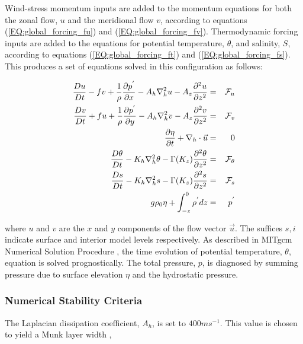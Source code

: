 Wind-stress momentum inputs are added to the momentum equations for both
the zonal flow, $u$ and the meridional flow $v$, according to equations 
(\ref{EQ:global_forcing_fu}) and (\ref{EQ:global_forcing_fv}).
Thermodynamic forcing inputs are added to the equations for
potential temperature, $\theta$, and salinity, $S$, according to equations 
(\ref{EQ:global_forcing_ft}) and (\ref{EQ:global_forcing_fs}).
This produces a set of equations solved in this configuration as follows:


\begin{eqnarray}
\label{EQ:model_equations}
\frac{Du}{Dt} - fv + 
  \frac{1}{\rho}\frac{\partial p^{'}}{\partial x} - 
  A_{h}\nabla_{h}^2u - A_{z}\frac{\partial^{2}u}{\partial z^{2}} 
& = &
{\cal F}_{u}
\\
\frac{Dv}{Dt} + fu + 
  \frac{1}{\rho}\frac{\partial p^{'}}{\partial y} - 
  A_{h}\nabla_{h}^2v - A_{z}\frac{\partial^{2}v}{\partial z^{2}} 
& = &
{\cal F}_{v}
\\
\frac{\partial \eta}{\partial t} + \nabla_{h}\cdot \vec{u}
&=&
0
\\
\frac{D\theta}{Dt} -
 K_{h}\nabla_{h}^2\theta  - \Gamma(K_{z})\frac{\partial^{2}\theta}{\partial z^{2}} 
& = &
{\cal F}_{\theta}
\\
\frac{D s}{Dt} -
 K_{h}\nabla_{h}^2 s  - \Gamma(K_{z})\frac{\partial^{2} s}{\partial z^{2}} 
& = &
{\cal F}_{s}
\\
g\rho_{0} \eta + \int^{0}_{-z}\rho^{'} dz & = & p^{'}
\\
\end{eqnarray}

\noindent where $u$ and $v$ are the $x$ and $y$ components of the
flow vector $\vec{u}$. The suffices ${s},{i}$ indicate surface and
interior model levels respectively. As described in
MITgcm Numerical Solution Procedure \cite{MITgcm_Numerical_Scheme}, the time 
evolution of potential temperature, $\theta$, equation is solved prognostically.
The total pressure, $p$, is diagnosed by summing pressure due to surface 
elevation $\eta$ and the hydrostatic pressure.
\\

\subsubsection{Numerical Stability Criteria}

The Laplacian dissipation coefficient, $A_{h}$, is set to $400 m s^{-1}$.
This value is chosen to yield a Munk layer width \cite{adcroft:95},


